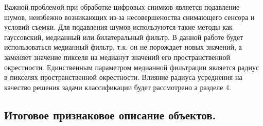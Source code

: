 \documentclass[14pt]{extarticle}
\begin{document}
Важной проблемой при обработке цифровых снимков является подавление шумов,
неизбежно возникающих из-за несовершеноства снимающего сенсора и условий съемки.
Для подавления шумов используются такие методы как гауссовский, медианный или билатеральный
фильтр. В данной работе будет использоваться медианный фильтр, т.к. он не порождает новых значений,
а заменяет значение пикселя на медианут значений его пространственной окрестности.
Единственным параметром медианной фильтрации является радиус в пикселях пространственной
окрестности. Влияние радиуса усреднения на качество решения задачи классификации будет рассмотрено
а разделе 4.

\subsection{Итоговое признаковое описание объектов.}
\end{document}
